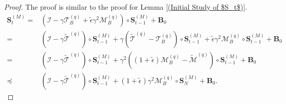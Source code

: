 \documentclass[11pt, letterpaper]{article}
\begin{document}
\begin{proof}
    The proof is similar to the proof for Lemma \ref{(Initial Study of $S_t$)}.
    \begin{equation*}
        \begin{aligned}
            \mathbf{S}_{t}^{(M)} =& (\mathcal{I}-\gamma\mathcal{T}_B^{(q)}+\tilde{\epsilon}\gamma^2\mathcal{M}_B^{(q)})\circ\mathbf{S}_{t-1}^{(M)}+\mathbf{B}_0\\
            =& (\mathcal{I}-\gamma\widetilde{\mathcal{T}}^{(q)})\circ\mathbf{S}_{t-1}^{(M)}+\gamma (\widetilde{\mathcal{T}}^{(q)}-{\mathcal{T}}_B^{(q)})\circ\mathbf{S}_{t-1}^{(M)}+\tilde{\epsilon}\gamma^2\mathcal{M}_B^{(q)}\circ \mathbf{S}_{t-1}^{(M)}+\mathbf{B}_0\\
            =& (\mathcal{I}-\gamma\widetilde{\mathcal{T}}^{(q)})\circ\mathbf{S}_{t-1}^{(M)}+\gamma^2 ((1+\tilde{\epsilon}){\mathcal{M}}_B^{(q)}-\widetilde{\mathcal{M}}^{(q)})\circ\mathbf{S}_{t-1}^{(M)}+\mathbf{B}_0\\
            \preceq&(\mathcal{I}-\gamma\tilde{\mathcal{T}}^{(q)})\circ\mathbf{S}_{t-1}^{(M)}+(1+\tilde{\epsilon})\gamma^{2}\mathcal{M}_B^{(q)}\circ\mathbf{S}_{N}^{(M)}+\mathbf{B}_{0}.
        \end{aligned}
    \end{equation*}
\end{proof}
\end{document}
